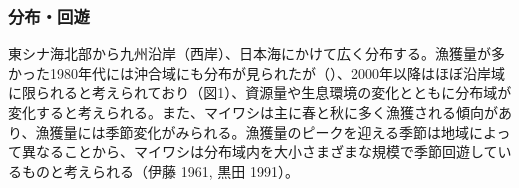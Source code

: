 \subsubsection{分布・回遊}
東シナ海北部から九州沿岸（西岸）、日本海にかけて広く分布する。漁獲量が多かった1980年代には沖合域にも分布が見られたが（\citealt{Hiyama1998}）、2000年以降はほぼ沿岸域に限られると考えられており（図1）、資源量や生息環境の変化とともに分布域が変化すると考えられる。また、マイワシは主に春と秋に多く漁獲される傾向があり、漁獲量には季節変化がみられる。漁獲量のピークを迎える季節は地域によって異なることから、マイワシは分布域内を大小さまざまな規模で季節回遊しているものと考えられる（伊藤 1961, 黒田 1991）。